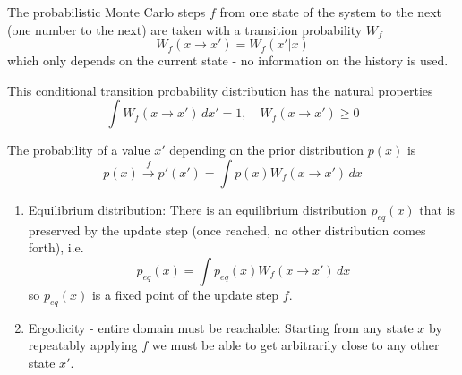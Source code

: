 The probabilistic Monte Carlo steps $f$ from one state of the system to the next (one number to the next)
are taken with a transition probability $W_f$
\begin{equation}
    W_f(x\rightarrow x') = W_f(x'|x)
\end{equation}
which \textcolor{blue1}{only depends on the current state} - no information on the history is used.

This conditional transition probability distribution has the natural properties
\begin{equation}
    \int W_f(x \rightarrow x') \, dx' = 1, \quad W_f(x \rightarrow x') \geq 0
\end{equation}


The probability of a value $x'$ depending on the prior distribution $p(x)$ is
\begin{equation}
    p(x) \overset{f}\rightarrow p'(x') = \int p(x) W_f(x\rightarrow x') \, dx
\end{equation}


\begin{enumerate}
    \item \textcolor{blue1}{Equilibrium distribution}: There is an equilibrium distribution $p_{eq}(x)$ that is
    preserved by the update step (once reached, no other distribution comes forth), i.e.
    \begin{equation}
        \label{eq:fix_point_MK}
        p_{eq}(x) = \int p_{eq}(x) W_f(x\rightarrow x') \, dx
    \end{equation}
    so $p_{eq}(x)$ is a fixed point of the update step $f$.
    \item \textcolor{blue1}{Ergodicity - entire domain must be reachable}: Starting from any state $x$ by repeatably
    applying $f$ we must be able to get arbitrarily close to any other state $x'$.
\end{enumerate}

